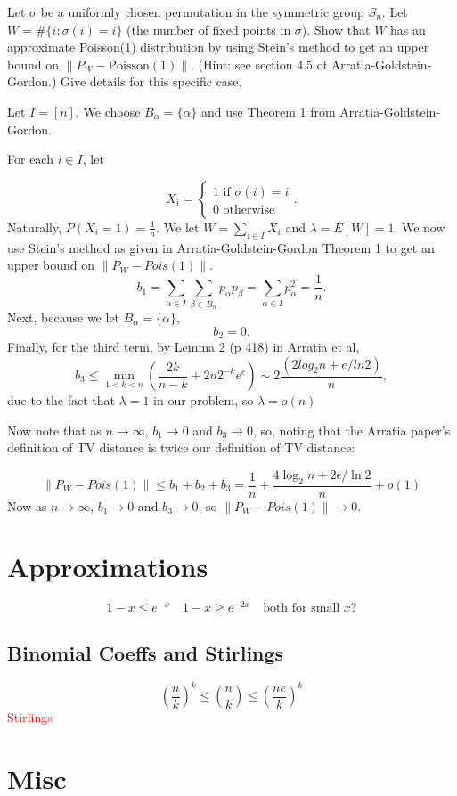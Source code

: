 \documentclass{article}
\newcommand{\answer}[1]{%
  \begin{tcolorbox}[
    colback=gray!9.8,
    boxrule=0.5pt,
    breakable]
  \small #1
  \end{tcolorbox}}
\newcommand\myworries[1]{\textcolor{red}{#1}}
\begin{document}
\begin{example}
    Let $\sigma$ be a uniformly chosen permutation in the symmetric group $S_n$. Let $W = \#\{i : \sigma(i) = i\}$ (the number of fixed points in $\sigma$). Show that $W$ has an approximate Poisson(1) distribution by using Stein's method to get an upper bound on $\|P_W - \text{Poisson}(1)\|$. (Hint: see section 4.5 of Arratia-Goldstein-Gordon.) Give details for this specific case.

\answer{
Let $I = [n]$. We choose $B_\alpha = \{\alpha\}$ and use Theorem 1 from Arratia-Goldstein-Gordon. 

For each $i\in I$, let

$$X_i = \begin{cases}
    1 \text{ if } \sigma(i) = i\\
    0 \text{ otherwise}
\end{cases}.$$
Naturally, $P(X_i =1) = \frac{1}{n}$. We let $W = \sum_{i\in I} X_i$ and $\lambda = E[W] = 1$. We now use Stein's method as given in Arratia-Goldstein-Gordon Theorem 1 to get an upper bound on $\lVert P_W - Pois(1)\rVert$.
$$b_1 = \sum_{\alpha\in I} \sum_{\beta \in B_\alpha} p_\alpha p_\beta = \sum_{\alpha \in I} p_\alpha^2 = \frac{1}{n}.$$
Next, because we let $B_\alpha = \{\alpha\}$, 
$$b_2 = 0.$$
Finally, for the third term, by Lemma 2 (p 418) in Arratia et al,
$$b_3 \leq \min_{1<k<n} (\frac{2k}{n-k} + 2n 2^{-k} e^{e})\sim 2\frac{(2log_2 n + e/ln 2)}{n},$$
due to the fact that $\lambda=1$ in our problem, so $\lambda = o(n)$

Now note that as $n\to \infty$, $b_1\to 0$ and $b_3\to 0$, so, noting that the Arratia paper's definition of TV distance is twice our definition of TV distance:

$$\lVert P_W - Pois(1)\rVert\leq b_1 + b_2 + b_3 = \frac{1}{n} + \frac{4\log_2 n + 2\epsilon/\ln 2}{n} + o(1)$$
Now as $n\to \infty$, $b_1 \to 0$ and $b_3 \to 0$, so $\lVert P_W - Pois(1)\rVert \to 0$. 
}
\end{example}

\begin{example}
    
\end{example}



\newpage 
\section{Approximations}

$$1-x \leq e^{-x} \quad 1-x\geq e^{-2x} \quad \text{both for small } x?$$  



\subsection{Binomial Coeffs and Stirlings}
$$(\frac{n}{k})^k \leq \binom{n}{k} \leq (\frac{ne}{k})^k $$
\myworries{Stirlings}


\section{Misc}
\begin{definition}[Metric]
\end{definition}
\end{document}
